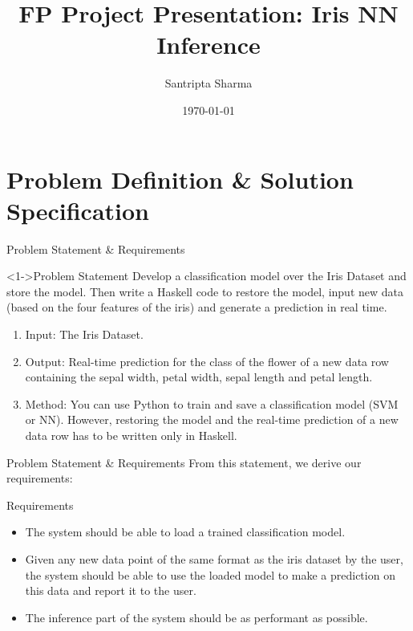 \documentclass{beamer}
\title{FP Project Presentation: Iris NN Inference}
\author{Santripta Sharma}
\date{\today}
\begin{document}
\begin{frame}
	\titlepage
\end{frame}	

\section{Problem Definition \& Solution Specification}

\begin{frame}{Problem Statement \& Requirements}
  \begin{block}<1->{Problem Statement}
    Develop a classification model over the Iris Dataset and store the model. Then write a Haskell code to restore the model, input new data (based on the four features of the iris) and generate a prediction in real time.
    \begin{enumerate}
      \item<2-> Input: The Iris Dataset.
      \item<2-> Output: Real-time prediction for the class of the flower of a new data row containing the sepal width, petal width, sepal length and petal length.
      \item<3-> Method: You can use Python to train and save a classification model (SVM or NN). However, restoring the model and the real-time prediction of a new data row has to be written only in Haskell.
    \end{enumerate}
  \end{block}
\end{frame}

\begin{frame}{Problem Statement \& Requirements}
  From this statement, we derive our requirements:
  \begin{block}{Requirements}
    \begin{itemize}
      \item<2-> The system should be able to load a trained classification model.
      \item<3-> Given any new data point of the same format as the iris dataset by the user, the system should be able to use the loaded model to make a prediction on this data and report it to the user.
      \item<4-> The inference part of the system should be as performant as possible.
    \end{itemize}
  \end{block}
\end{frame}
\end{document}
